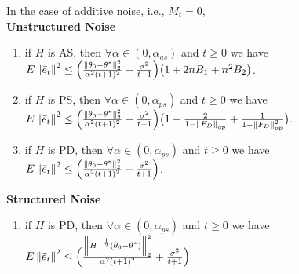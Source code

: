 \begin{theorem}
In the case of additive noise, i.e., $M_t=0$, \\
\textbf{Unstructured Noise}
\begin{enumerate}[label=(\roman*)]
\item if $H$ is AS, then $\forall \alpha\in (0,\alpha_{as})$ and $t\geq0 $ we have $E\left\| \bar{e}_t\right\|^2\leq \Big(\frac{\left\| \theta_0-\theta^*\right\|^2_2}{\alpha^2(t+1)^2}+\frac{\sigma^2}{t+1}\Big)\big(1+2nB_1+n^2B_2\big)$.
\item if $H$ is PS, then $\forall \alpha \in (0,\alpha_{ps})$ and $t\geq 0$ we have $E\left\| \bar{e}_t\right\|^2\leq \Big(\frac{\left\| \theta_0-\theta^*\right\|^2_2}{\alpha^2(t+1)^2}+\frac{\sigma^2}{t+1}\Big)\big(1+\frac{2}{1-\left\| F_D\right\|_{op}}+\frac{1}{1-\left\| F_D\right\|^2_{op}}\big)$.
\item if $H$ is PD, then $\forall \alpha \in (0,\alpha_{ps})$ and $t\geq 0$ we have $E\left\| \bar{e}_t\right\|^2\leq \Big(\frac{\left\| \theta_0-\theta^*\right\|^2_2}{\alpha^2(t+1)^2}+\frac{\sigma^2}{t+1}\Big)$.
\end{enumerate}
\textbf{Structured Noise}
\begin{enumerate}[label=(\roman*)]
\item if $H$ is PD, then $\forall \alpha \in (0,\alpha_{ps})$ and $t\geq 0$ we have $E\left\| \bar{e}_t\right\|^2\leq \Big(\frac{\left\| H^{-\frac{1}{2}}(\theta_0-\theta^*)\right\|^2_2}{\alpha^2(t+1)^2}+\frac{\sigma^2}{t+1}\Big)$
\end{enumerate}
\end{theorem}

